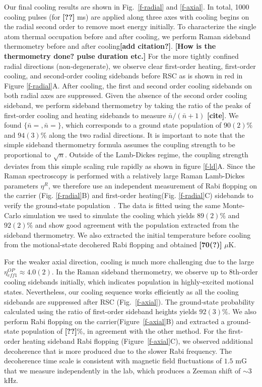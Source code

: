 \documentclass[aps,prl,twocolumn,groupedaddress]{revtex4-1}
\renewcommand{\fxnote}[1]{{\textbf{[#1]}}}
\begin{document}
Our final cooling results are shown in Fig.~\ref{f-radial} and \ref{f-axial}.
In total, 1000 cooling pulses (for \fxnote{??} ms) are applied along three axes with
cooling begins on the radial second order to remove most energy initially.
To characterize the single atom thermal occupation before and after cooling,
we perform Raman sideband thermometry before and after cooling\fxnote{add citation?}.
\fxnote{How is the thermometry done? pulse duration etc.}
For the more tightly confined radial directions (non-degenerate),
we observe clear first-order heating, first-order cooling,
and second-order cooling sidebands before RSC as is shown in red in Figure \ref{f-radial}A.
After cooling, the first and second order cooling sidebands on both radial axes are suppressed.
Given the absence of the second order cooling sideband, we perform sideband thermometry
by taking the ratio of the peaks of first-order cooling and heating sidebands to measure $\bar n / (\bar n + 1)$ \fxnote{cite}.
We found $\{\bar n =,\bar n =\}$, which corresponds to a ground state population of $90(2)\%$
and $94(3)\%$ along the two radial directions.
It is important to note that the simple sideband thermometry formula assumes the coupling strength
to be proportional to $\sqrt{n}$. Outside of the Lamb-Dickes regime,
the coupling strength deviates from this simple scaling rule rapidly
as shown in figure \ref{f-ld}A. Since the Raman spectroscopy is performed
with a relatively large Raman Lamb-Dickes parameters $\eta^R$,
we therefore use an independent measurement of Rabi flopping on the carrier (Fig. \ref{f-radial}B)
and first-order heating(Fig. \ref{f-radial}C) sidebands
to verify the ground-state population~\cite{Meekhof1996}.
The data is fitted using the same Monte-Carlo simulation we used to simulate the cooling which yields $89(2)\%$ and $92(2)\%$ and show good agreement with the population extracted from the sideband thermometry. We also extracted the initial temperature before cooling from the motional-state decohered Rabi flopping and obtained \fxnote{70(?)} $\mu$K.

For the weaker axial direction, cooling is much more challenging
due to the large $\eta^{OP}_{eff1}\approx 4.0(2)$.
In the Raman sideband thermometry, we observe up to 8th-order cooling sidebands initially,
which indicates population in highly-excited motional states.
Nevertheless, our cooling sequence works efficiently as all the cooling sidebands are suppressed
after RSC (Fig.~\ref{f-axial}).
The ground-state probability calculated using the ratio of first-order sideband heights yields
$92(3)\%$. We also perform Rabi flopping on the carrier(Figure~\ref{f-axial}B)
and extracted a ground-state population of \fxnote{??}\%, in agreement with the other method.
For the first-order heating sideband Rabi flopping (Figure~\ref{f-axial}C),
we observed additional decoherence that is more produced due to the slower Rabi frequency.
The decoherence time scale is consistent with magnetic field fluctuations of $1.5$ mG
that we measure independently in the lab, which produces a Zeeman shift of $\sim 3$ kHz.
\end{document}
